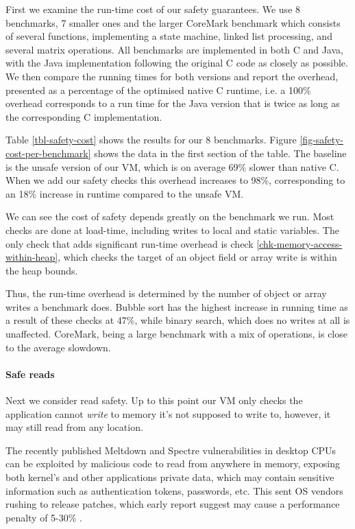 First we examine the run-time cost of our safety guarantees. We use 8 benchmarks, 7 smaller ones and the larger CoreMark benchmark \cite{coremark} which consists of several functions, implementing a state machine, linked list processing, and several matrix operations. All benchmarks are implemented in both C and Java, with the Java implementation following the original C code as closely as possible. We then compare the running times for both versions and report the overhead, presented as a percentage of the optimised native C runtime, i.e. a 100\% overhead corresponds to a run time for the Java version that is twice as long as the corresponding C implementation.

Table \ref{tbl-safety-cost} shows the results for our 8 benchmarks. Figure \ref{fig-safety-cost-per-benchmark} shows the data in the first section of the table. The baseline is the unsafe version of our VM, which is on average 69\% slower than native C. When we add our safety checks this overhead increases to 98\%, corresponding to an 18\% increase in runtime compared to the unsafe VM.

We can see the cost of safety depends greatly on the benchmark we run. Most checks are done at load-time, including writes to local and static variables. The only check that adds significant run-time overhead is check \ref{chk-memory-access-within-heap}, which checks the target of an object field or array write is within the heap bounds.

Thus, the run-time overhead is determined by the number of object or array writes a benchmark does. Bubble sort has the highest increase in running time as a result of these checks at 47\%, while binary search, which does no writes at all is unaffected. CoreMark, being a large benchmark with a mix of operations, is close to the average slowdown.

\paragraph{Safe reads}
Next we consider read safety. Up to this point our VM only checks the application cannot \emph{write} to memory it's not supposed to write to, however, it may still read from any location.

The recently published Meltdown and Spectre vulnerabilities in desktop CPUs can be exploited by malicious code to read from anywhere in memory, exposing both kernel's and other applications private data, which may contain sensitive information such as authentication tokens, passwords, etc. This sent OS vendors rushing to release patches, which early report suggest may cause a performance penalty of 5-30\% \cite{register-spectre-meltdown}.

